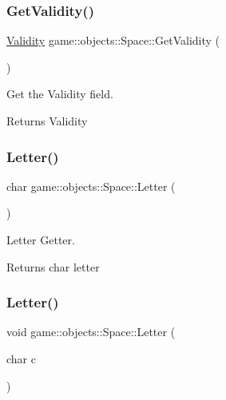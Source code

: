 \subsubsection{\texorpdfstring{Get\+Validity()}{GetValidity()}}
{\footnotesize\ttfamily \hyperlink{Validity_8h_acb8ce664e8a953fe8c27d7f0b37cbca4}{Validity} game\+::objects\+::\+Space\+::\+Get\+Validity (\begin{DoxyParamCaption}{ }\end{DoxyParamCaption})}



Get the Validity field. 

\begin{DoxyReturn}{Returns}
Validity 
\end{DoxyReturn}
\mbox{\label{classgame_1_1objects_1_1Space_a09d18080892a9c6d4d84ad2c81819a5e}} 
\subsubsection{\texorpdfstring{Letter()}{Letter()}\hspace{0.1cm}{\footnotesize\ttfamily [1/2]}}
{\footnotesize\ttfamily char game\+::objects\+::\+Space\+::\+Letter (\begin{DoxyParamCaption}{ }\end{DoxyParamCaption})}



Letter Getter. 

\begin{DoxyReturn}{Returns}
char letter 
\end{DoxyReturn}
\mbox{\label{classgame_1_1objects_1_1Space_a93ee0033d8184fac73533faca731fb08}} 
\subsubsection{\texorpdfstring{Letter()}{Letter()}\hspace{0.1cm}{\footnotesize\ttfamily [2/2]}}
{\footnotesize\ttfamily void game\+::objects\+::\+Space\+::\+Letter (\begin{DoxyParamCaption}\item[{char}]{c }\end{DoxyParamCaption})}



